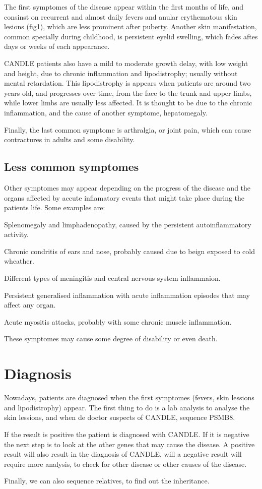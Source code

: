 \documentclass[a4paper,10pt]{report}
\begin{document}
The first symptomes of the disease appear within the first months of life, and consinst on recurrent and almost daily fevers and anular erythematous skin lesions (fig1), which are less prominent after puberty. Another skin manifestation, common specially during childhood, is persistent eyelid swelling, which fades aftes days or weeks of each appearance.\par
CANDLE patients also have a mild to moderate growth delay, with low weight and height, due to chronic inflammation and lipodistrophy; usually without mental retardation. This lipodistrophy is appears when patients are around two years old, and progresses over time, from the face to the trunk and upper limbs, while lower limbs are usually less affected. It is thought to be due to the chronic inflammation, and the cause of another symptome, hepatomegaly. \par
Finally, the last common symptome is arthralgia, or joint pain, which can cause contractures in adults and some disability.

\subsection{Less common symptomes}

Other symptomes may appear depending on the progress of the disease and the organs affected by accute inflamatory events that might take place during the patients life. Some examples are:
\begin{itemsize}
  \item Splenomegaly and limphadenopathy, caused by the persistent autoinflammatory activity.
  \item Chronic condritis of ears and nose, probably caused due to beign exposed to cold wheather.
  \item Different types of meningitis and central nervous system inflammaion.
  \item Persistent generalised inflammation with acute inflammation episodes that may affect any organ.
  \item Acute myositis attacks, probably with some chronic muscle inflammation.
\end{itemsize}
These symptomes may cause some degree of disability or even death.

\section{Diagnosis}

Nowadays, patients are diagnosed when the first symptomes (fevers, skin lessions and lipodistrophy) appear. The first thing to do is a lab analysis to analyse the skin lessions, and when de doctor suspects of CANDLE, sequence PSMB8.\par
If the result is positive the patient is diagnosed with CANDLE. If it is negative the next step is to look at the other genes that may cause the disease. A positive result will also result in the diagnosis of CANDLE, will a negative result will require more analysis, to check for other disease or other causes of the disease.\par
Finally, we can also sequence relatives, to find out the inheritance.
\end{document}
